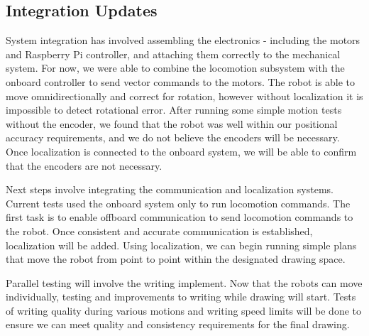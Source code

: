 \subsection{Integration Updates}
\label{sec:integration_progress}
System integration has involved assembling the electronics - including the motors and Raspberry Pi controller, and attaching them correctly to the mechanical system. For now, we were able to combine the locomotion subsystem with the onboard controller to send vector commands to the motors. The robot is able to move omnidirectionally and correct for rotation, however without localization it is impossible to detect rotational error. After running some simple motion tests without the encoder, we found that the robot was well within our positional accuracy requirements, and we do not believe the encoders will be necessary. Once localization is connected to the onboard system, we will be able to confirm that the encoders are not necessary.

Next steps involve integrating the communication and localization systems. Current tests used the onboard system only to run locomotion commands. The first task is to enable offboard communication to send locomotion commands to the robot. Once consistent and accurate communication is established, localization will be added. Using localization, we can begin running simple plans that move the robot from point to point within the designated drawing space.

Parallel testing will involve the writing implement. Now that the robots can move individually, testing and improvements to writing while drawing will start. Tests of writing quality during various motions and writing speed limits will be done to ensure we can meet quality and consistency requirements for the final drawing.


\clearpage
